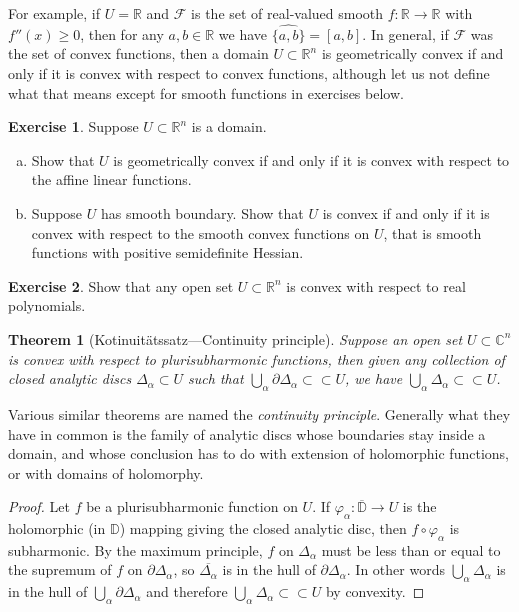 \documentclass[12pt,openany]{book}
\newcommand{\C}{{\mathbb{C}}}
\newcommand{\R}{{\mathbb{R}}}
\newcommand{\D}{{\mathbb{D}}}
\newcommand{\sF}{{\mathscr{F}}}
\theoremstyle{plain}
\newtheorem{thm}{Theorem}[section]
\theoremstyle{remark}
\theoremstyle{definition}
\newenvironment{exbox}{%
    \def\FrameCommand{\vrule width 1pt \relax\hspace {10pt}}%
    \MakeFramed {\advance \hsize -\width \FrameRestore }%
}{%
    \endMakeFramed
}
\newenvironment{exparts}{%
    \leavevmode\begin{enumerate}[a),noitemsep,topsep=0pt,parsep=0pt,partopsep=0pt]
}{%
    \end{enumerate}
}
\theoremstyle{exercise}
\newtheorem{exercise}{Exercise}[section]
\theoremstyle{example}
\begin{document}
For example, if $U=\R$ and $\sF$ is the set of real-valued smooth
$f \colon \R \to \R$ with $f''(x) \geq 0$, then for any $a,b \in \R$
we have $\widehat{\{ a, b \}} = [a,b]$.
In general, if $\sF$ was the set of convex functions, then 
a domain $U \subset \R^n$ is geometrically convex if and only if it is
convex with respect to convex functions, although let us not define
what that means except for smooth functions in exercises below.

\begin{exbox}
\begin{exercise} \label{exercise:geomconvexfuncs}
Suppose $U \subset \R^n$ is a domain.
\begin{exparts}
\item
Show that $U$
is geometrically convex if and only if it is
convex with respect to the affine linear functions.
\item
Suppose $U$
has smooth boundary.
Show that $U$ is 
convex if and only if it is
convex with respect to the smooth convex functions on $U$,
that is smooth functions with positive semidefinite Hessian.
\end{exparts}
\end{exercise}

\begin{exercise}
Show that any open set $U \subset \R^n$ is convex with respect to real
polynomials.
\end{exercise}
\end{exbox}

\begin{thm}[Kotinuit\"atssatz---Continuity
principle]
\label{thm:contprinciple}
Suppose an open set $U \subset \C^n$ is convex with respect to plurisubharmonic
functions,
then given any collection of closed analytic discs $\Delta_\alpha \subset U$
such that $\bigcup_\alpha \partial \Delta_\alpha \subset \subset U$,
we have
$\bigcup_\alpha \Delta_\alpha \subset \subset U$.
\end{thm}

Various similar theorems are named the \emph{continuity principle}.
Generally what they have in common is the family of analytic discs whose
boundaries stay inside a domain, and whose conclusion has to do
with extension of holomorphic functions, or with domains of holomorphy.

\begin{proof}
Let $f$ be a plurisubharmonic function on $U$.  If $\varphi_\alpha \colon
\overline{\D} \to U$ is the holomorphic (in $\D$) mapping giving the closed
analytic disc, then $f \circ \varphi_\alpha$ is subharmonic.
By the maximum principle,
$f$ on $\Delta_\alpha$ must be less than or equal to the supremum
of $f$ on $\partial \Delta_\alpha$, so $\overline{\Delta_\alpha}$
is in the hull of 
$\partial \Delta_\alpha$.
In other words
$\bigcup_\alpha \Delta_\alpha$ is in the hull of
$\bigcup_\alpha \partial \Delta_\alpha$ and therefore 
$\bigcup_\alpha \Delta_\alpha \subset \subset U$ by convexity.
\end{proof}
\end{document}
